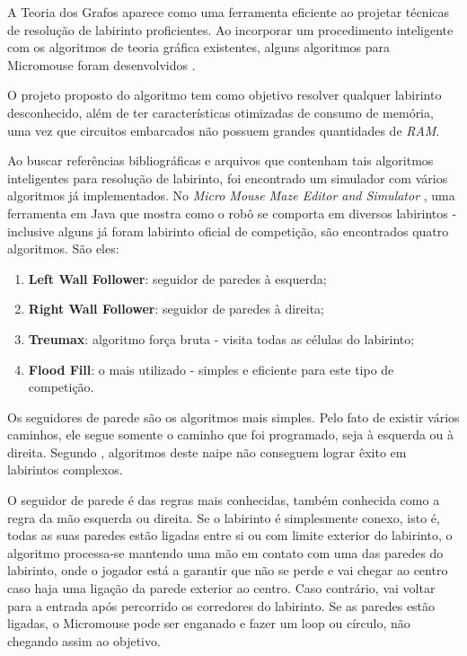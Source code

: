 A Teoria dos Grafos aparece como uma ferramenta eficiente ao projetar técnicas de resolução de labirinto proficientes. Ao incorporar um procedimento inteligente com os algoritmos de teoria gráfica existentes, alguns algoritmos para Micromouse foram desenvolvidos \cite{5656597}.

O projeto proposto do algoritmo tem como objetivo resolver qualquer labirinto desconhecido, além de ter características otimizadas de consumo de memória, uma vez que circuitos embarcados não possuem grandes quantidades de \emph{RAM}.

Ao buscar referências bibliográficas e arquivos que contenham tais algoritmos inteligentes para resolução de labirinto, foi encontrado um simulador com vários algoritmos já implementados. No \emph{Micro Mouse Maze Editor and Simulator} \cite{solver:2013}, uma ferramenta em Java que mostra como o robô se comporta em diversos labirintos - inclusive alguns já foram labirinto oficial de competição, são encontrados quatro algoritmos. São eles:

\begin{enumerate}[leftmargin=2cm,label=\alph*)]
\item \textbf{Left Wall Follower}: seguidor de paredes à esquerda;
\item \textbf{Right Wall Follower}: seguidor de paredes à direita;
\item \textbf{Treumax}: algoritmo força bruta - visita todas as células do labirinto;
\item \textbf{Flood Fill}: o mais utilizado - simples e eficiente para este tipo de competição.
\end{enumerate}

Os seguidores de parede são os algoritmos mais simples. Pelo fato de existir vários caminhos, ele segue somente o caminho que foi programado, seja à esquerda ou à direita. Segundo , algoritmos deste naipe não conseguem lograr êxito em labirintos complexos.

\begin{citacao}

O seguidor de parede é das regras mais conhecidas, também conhecida como a regra da mão esquerda ou direita. Se o labirinto é simplesmente conexo, isto é,
todas as suas paredes estão ligadas entre si ou com limite exterior do labirinto, o algoritmo processa-se mantendo uma mão em contato com uma das paredes do labirinto, onde o jogador está a garantir que não se perde e vai chegar ao centro caso haja uma ligação da parede exterior ao centro. Caso contrário, vai voltar para a entrada após percorrido os corredores do labirinto. Se as paredes estão ligadas, o Micromouse pode ser enganado e fazer um loop ou círculo, não chegando assim ao objetivo. 

\end{citacao}

